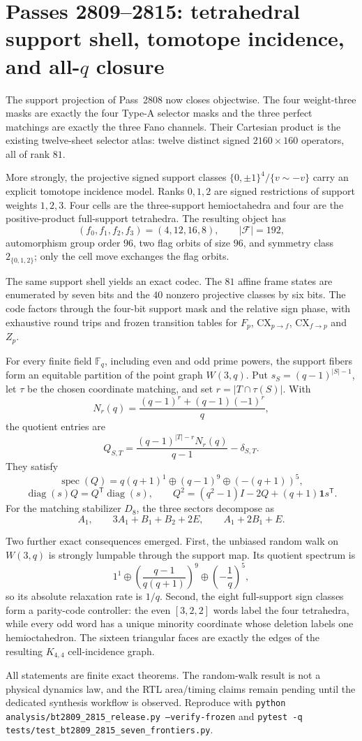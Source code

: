 \section*{Passes 2809--2815: tetrahedral support shell, tomotope incidence, and all-$q$ closure}

The support projection of Pass~2808 now closes objectwise.  The four
weight-three masks are exactly the four Type-A selector masks and the three
perfect matchings are exactly the three Fano channels.  Their Cartesian product
is the existing twelve-sheet selector atlas: twelve distinct signed
$2160\times160$ operators, all of rank $81$.

More strongly, the projective signed support classes
$\{0,\pm1\}^4/\{v\sim-v\}$ carry an explicit tomotope incidence model.  Ranks
$0,1,2$ are signed restrictions of support weights $1,2,3$.  Four cells are the
three-support hemioctahedra and four are the positive-product full-support
tetrahedra.  The resulting object has
\[
 (f_0,f_1,f_2,f_3)=(4,12,16,8),\qquad |\mathcal F|=192,
\]
automorphism group order $96$, two flag orbits of size $96$, and symmetry class
$2_{\{0,1,2\}}$; only the cell move exchanges the flag orbits.

The same support shell yields an exact codec.  The $81$ affine frame states are
enumerated by seven bits and the $40$ nonzero projective classes by six bits.
The code factors through the four-bit support mask and the relative sign phase,
with exhaustive round trips and frozen transition tables for
$F_p$, $\mathrm{CX}_{p\to f}$, $\mathrm{CX}_{f\to p}$ and $Z_p$.

For every finite field $\mathbb F_q$, including even and odd prime powers, the
support fibers form an equitable partition of the point graph $W(3,q)$.  Put
$s_S=(q-1)^{|S|-1}$, let $\tau$ be the chosen coordinate matching, and set
$r=|T\cap\tau(S)|$.  With
\[
 N_r(q)=\frac{(q-1)^r+(q-1)(-1)^r}{q},
\]
the quotient entries are
\[
 Q_{S,T}=\frac{(q-1)^{|T|-r}N_r(q)}{q-1}-\delta_{S,T}.
\]
They satisfy
\[
 \operatorname{spec}(Q)=
 q(q+1)^1\oplus(q-1)^9\oplus(-(q+1))^5,
\]
\[
 \operatorname{diag}(s)Q=Q^{\mathsf T}\operatorname{diag}(s),\qquad
 Q^2=(q^2-1)I-2Q+(q+1)\mathbf1s^{\mathsf T}.
\]
For the matching stabilizer $D_8$, the three sectors decompose as
\[
 A_1,\qquad 3A_1+B_1+B_2+2E,\qquad A_1+2B_1+E.
\]

Two further exact consequences emerged.  First, the unbiased random walk on
$W(3,q)$ is strongly lumpable through the support map.  Its quotient spectrum
is
\[
 1^1\oplus\left(\frac{q-1}{q(q+1)}\right)^9
 \oplus\left(-\frac1q\right)^5,
\]
so its absolute relaxation rate is $1/q$.  Second, the eight full-support sign
classes form a parity-code controller: the even $[3,2,2]$ words label the four
tetrahedra, while every odd word has a unique minority coordinate whose
deletion labels one hemioctahedron.  The sixteen triangular faces are exactly
the edges of the resulting $K_{4,4}$ cell-incidence graph.

All statements are finite exact theorems.  The random-walk result is not a
physical dynamics law, and the RTL area/timing claims remain pending until the
dedicated synthesis workflow is observed.  Reproduce with
\texttt{python analysis/bt2809\_2815\_release.py --verify-frozen} and
\texttt{pytest -q tests/test\_bt2809\_2815\_seven\_frontiers.py}.
